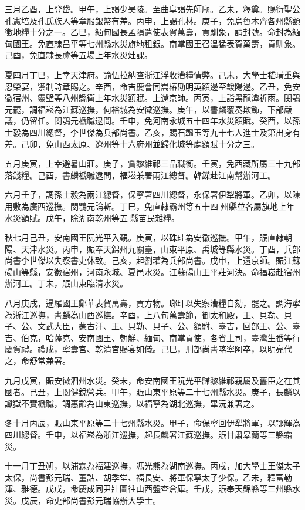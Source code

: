 \begin{pinyinscope}
三月乙酉，上登岱。甲午，上謁少昊陵。至曲阜謁先師廟。乙未，釋奠。賜衍聖公孔憲培及孔氏族人等章服銀幣有差。丙申，上謁孔林。庚子，免烏魯木齊各州縣額徵地糧十分之一。乙巳，緬甸國長孟隕遣使表賀萬壽，貢馴象，請封號。命封為緬甸國王。免直隸昌平等七州縣水災旗地租銀。南掌國王召溫猛表賀萬壽，貢馴象。己酉，免直隸長蘆等五場上年水災灶課。

夏四月丁巳，上幸天津府。諭伍拉納查浙江浮收漕糧情弊。己未，大學士嵇璜重與恩榮宴，禦制詩章賜之。辛酉，命吉慶會同嵩椿勘明英額邊至靉陽邊。乙丑，免安徽宿州、靈壁等八州縣衛上年水災額賦。上還京師。丙寅，上詣黑龍潭祈雨。閔鶚元罷，調福崧為江蘇巡撫，何裕城為安徽巡撫。庚午，以書麟覆奏欺飾，下部嚴議，仍留任。閔鶚元褫職逮問。壬申，免河南永城五十四年水災額賦。癸酉，以孫士毅為四川總督，李世傑為兵部尚書。乙亥，賜石韞玉等九十七人進士及第出身有差。己卯，免山西太原、遼州等十六府州並歸化城等處額賦十分之三。

五月庚寅，上幸避暑山莊。庚子，賞黎維祁三品職銜。壬寅，免西藏所屬三十九部落錢糧。己酉，書麟褫職逮問，福崧兼署兩江總督。韓鑅赴江南幫辦河工。

六月壬子，調孫士毅為兩江總督，保寧署四川總督，永保署伊犁將軍。乙卯，以陳用敷為廣西巡撫。閔鶚元論斬。丁巳，免直隸霸州等五十四州縣並各屬旗地上年水災額賦。戊午，除湖南乾州等五縣苗民雜糧。

秋七月己丑，安南國王阮光平入覲。庚寅，以硃珪為安徽巡撫。甲午，賑直隸朝陽、天津水災。丙申，賑奉天錦州九關臺，山東平原、禹城等縣水災。丁酉，兵部尚書李世傑以失察書吏休致。己亥，起劉瓘為兵部尚書。戊申，上還京師。賑江蘇碭山等縣，安徽宿州，河南永城、夏邑水災。江蘇碭山王平莊河決。命福崧赴宿州辦河工。丁未，賑山東臨清水災。

八月庚戌，暹羅國王鄭華表賀萬壽，貢方物。瑯玕以失察漕糧自劾，罷之。調海寧為浙江巡撫，書麟為山西巡撫。辛酉，上八旬萬壽節，御太和殿，王、貝勒、貝子、公、文武大臣，蒙古汗、王、貝勒、貝子、公、額駙、臺吉，回部王、公、臺吉、伯克，哈薩克、安南國王、朝鮮、緬甸、南掌貢使，各省土司，臺灣生番等行慶賀禮。禮成，寧壽宮、乾清宮賜宴如儀。己巳，刑部尚書喀寧阿卒，以明亮代之，命舒常兼署。

九月戊寅，賑安徽泗州水災。癸未，命安南國王阮光平歸黎維祁親屬及舊臣之在其國者。己丑，上閱健銳營兵。甲午，賑山東平原等二十七州縣水災。庚子，長麟以讞獄不實褫職，調惠齡為山東巡撫，以福寧為湖北巡撫，畢沅兼署之。

冬十月丙辰，賑山東平原等二十七州縣水災。甲子，命保寧回伊犁將軍，以鄂輝為四川總督。壬申，以福崧為浙江巡撫，起長麟署江蘇巡撫。賑甘肅皋蘭等三縣霜災。

十一月丁丑朔，以浦霖為福建巡撫，馮光熊為湖南巡撫。丙戌，加大學士王傑太子太保，尚書彭元瑞、董誥、胡季堂、福長安、將軍保寧太子少保。乙未，釋富勒渾、雅德。戊戌，命慶成同尹壯圖往山西盤查倉庫。壬戌，賑奉天錦縣等三州縣水災。戊辰，命吏部尚書彭元瑞協辦大學士。


\end{pinyinscope}
